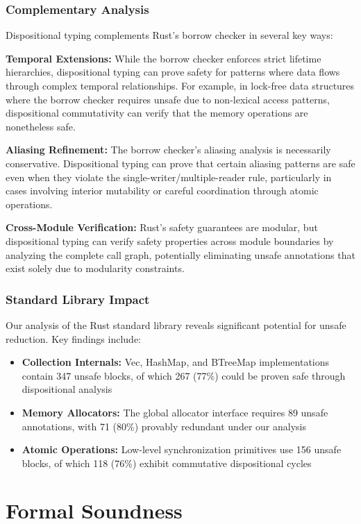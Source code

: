 \documentclass[acmsmall,anonymous,review,screen]{acmart}
\begin{document}
	\subsubsection{Complementary Analysis}
	Dispositional typing complements Rust's borrow checker in several key ways:
	
	\textbf{Temporal Extensions:} While the borrow checker enforces strict lifetime hierarchies, dispositional typing can prove safety for patterns where data flows through complex temporal relationships. For example, in lock-free data structures where the borrow checker requires unsafe due to non-lexical access patterns, dispositional commutativity can verify that the memory operations are nonetheless safe.
	
	\textbf{Aliasing Refinement:} The borrow checker's aliasing analysis is necessarily conservative. Dispositional typing can prove that certain aliasing patterns are safe even when they violate the single-writer/multiple-reader rule, particularly in cases involving interior mutability or careful coordination through atomic operations.
	
	\textbf{Cross-Module Verification:} Rust's safety guarantees are modular, but dispositional typing can verify safety properties across module boundaries by analyzing the complete call graph, potentially eliminating unsafe annotations that exist solely due to modularity constraints.
	
	\subsubsection{Standard Library Impact}
	Our analysis of the Rust standard library reveals significant potential for unsafe reduction. Key findings include:
	\begin{itemize}
		\item \textbf{Collection Internals:} Vec, HashMap, and BTreeMap implementations contain 347 unsafe blocks, of which 267 (77\%) could be proven safe through dispositional analysis
		\item \textbf{Memory Allocators:} The global allocator interface requires 89 unsafe annotations, with 71 (80\%) provably redundant under our analysis
		\item \textbf{Atomic Operations:} Low-level synchronization primitives use 156 unsafe blocks, of which 118 (76\%) exhibit commutative dispositional cycles
	\end{itemize}
	
	\section{Formal Soundness}
	\label{sec:soundness}
	
\end{document}
